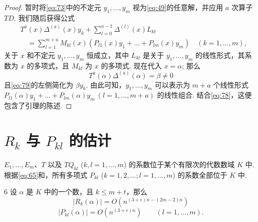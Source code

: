 \begin{proof}
暂时将\eqref{eq:73}中的不定元 $y_1, \dots, y_m$ 视为\eqref{eq:49}的任意解，并应用 $a$ 次算子 $TD$. 我们随后获得公式
\begin{equation}
\begin{aligned}
& T^{a}(x) \Delta^{(a)}(x)y_{k} + \sum_{l=0}^{a-1} \Delta^{(l)}(x)L_{kl} \\
& \quad = \sum_{l=1}^{m+a} M_{kl}(x) \left(P_{l1}(x)y_{1} + \dots + P_{lm}(x)y_{m}\right) \quad (k=1,\dots,m),
\end{aligned}
\tag{79}\label{eq:79}
\end{equation}
关于 $x$ 和不定元 $y_1, \dots, y_m$ 恒成立，其中 $L_{kl}$ 是关于 $y_1, \dots, y_m$ 的线性形式，其系数为 $x$ 的多项式，且 $M_{kl}$ 为 $x$ 的多项式. 现在代入 $x = \alpha$; 那么
\[T^{a}(\alpha) \Delta^{(a)}(\alpha) = \beta \neq 0\]
且\eqref{eq:79}的左侧简化为 $\beta y_k$. 由此可知，$y_1, \dots, y_m$ 可以表示为 $m+a$ 个线性形式 $P_{l1}(\alpha)y_1 + \dots + P_{lm}(\alpha)y_m \ (l = 1, \dots, m+a)$ 的线性组合. 结合\eqref{eq:78}，这便包含了引理的陈述.
\end{proof}

\section{$R_k$ 与 $P_{kl}$ 的估计}

$E_1, \dots, E_m$、$T$ 以及 $T Q_{kl}$ ($k, l = 1, \dots, m$) 的系数位于某个有限次的代数数域 $K$ 中. 根据\eqref{eq:65}和，所有多项式 $P_{kl}$ ($k=1, 2, \dots; l=1, \dots, m$) 的系数全部位于 $K$ 中.

\begin{mylemma}{}{6}
设 $\alpha$ 是 $K$ 中的一个数，且 $k \le m+t$，那么
\[|R_{k}(\alpha)| = O \left(n^{(3+\epsilon)n - (2m-2)n}\right)\]
\[\overline{|P_{kl}(\alpha)|} = O \left(n^{(3+\epsilon)n}\right) \qquad (l=1,\dots,m).\]
\end{mylemma}

